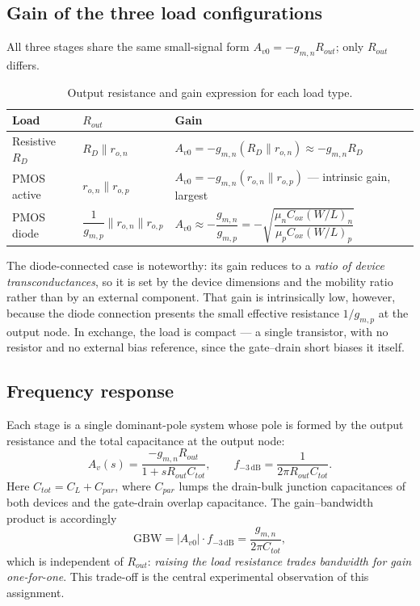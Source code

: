 \documentclass[12pt,a4paper]{article}
\newcommand{\U}[1]{\,\mathrm{#1}}
\newcommand{\WLi}[1]{\left(W/L\right)_{#1}}
\begin{document}
\subsection{Gain of the three load configurations}
All three stages share the same small-signal form
$A_{v0} = -g_{m,n} R_{out}$; only $R_{out}$ differs.

\begin{table}[H]
\centering
\caption{Output resistance and gain expression for each load type.}
\label{tab:loadexpr}
\begin{tabular}{llL{5.9cm}}
\toprule
\textbf{Load} & \textbf{$R_{out}$} & \textbf{Gain} \\
\midrule
Resistive $R_D$ & $R_D \parallel r_{o,n}$ &
  $A_{v0}=-g_{m,n}(R_D\parallel r_{o,n})\approx -g_{m,n}R_D$ \\
PMOS active     & $r_{o,n}\parallel r_{o,p}$ &
  $A_{v0}=-g_{m,n}(r_{o,n}\parallel r_{o,p})$ --- intrinsic gain, largest \\
PMOS diode      & $\dfrac{1}{g_{m,p}}\parallel r_{o,n}\parallel r_{o,p}$ &
  $A_{v0}\approx-\dfrac{g_{m,n}}{g_{m,p}}
   =-\sqrt{\dfrac{\mu_n C_{ox}\WLi{n}}{\mu_p C_{ox}\WLi{p}}}$ \\
\bottomrule
\end{tabular}
\end{table}

The diode-connected case is noteworthy: its gain reduces to a \emph{ratio of
device transconductances}, so it is set by the device dimensions and the
mobility ratio rather than by an external component. That gain is
intrinsically low, however, because the diode connection presents the small
effective resistance $1/g_{m,p}$ at the output node. In exchange, the load is
compact --- a single transistor, with no resistor and no external bias
reference, since the gate--drain short biases it itself.

\subsection{Frequency response}
Each stage is a single dominant-pole system whose pole is formed by the output
resistance and the total capacitance at the output node:
\begin{equation}
A_v(s) = \frac{-g_{m,n}R_{out}}{1+sR_{out}C_{tot}},
\qquad
f_{-3\U{dB}} = \frac{1}{2\pi R_{out} C_{tot}}.
\label{eq:f3db}
\end{equation}
Here $C_{tot}=C_L+C_{par}$, where $C_{par}$ lumps the drain-bulk junction
capacitances of both devices and the gate-drain overlap capacitance. The
gain--bandwidth product is accordingly
\begin{equation}
\mathrm{GBW} = |A_{v0}|\cdot f_{-3\U{dB}} = \frac{g_{m,n}}{2\pi C_{tot}},
\label{eq:gbw}
\end{equation}
which is independent of $R_{out}$: \emph{raising the load resistance trades
bandwidth for gain one-for-one}. This trade-off is the central experimental
observation of this assignment.
\end{document}
